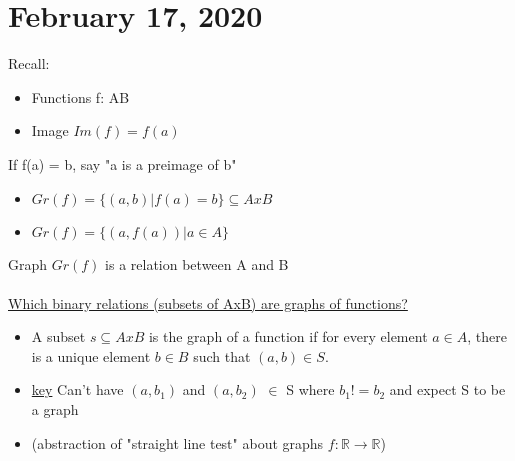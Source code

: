 \documentclass{article}
\begin{document}
\tableofcontents

\section{February 17, 2020}
   
Recall:
\begin{itemize}
  \item Functions f: A\textrightarrow  B
  \item Image $Im(f) = f(a)$
\end{itemize}

\noindent If f(a) = b, say "a is a preimage of b"
\begin{itemize}
  \item $Gr(f) = \{(a,b) | f(a)=b\}\subseteq AxB$
  \item $Gr(f) = \{(a,f(a)) | a \in A\}$
\end{itemize}

\noindent Graph $Gr(f)$ is a relation between A and B\\
\\
\underline{Which binary relations (subsets of AxB) are graphs of functions?}
\begin{itemize}
  \item A subset $s\subseteq AxB$ is the graph of a function if for every element $a \in A$, there is a unique element $b \in B$ such that $(a,b) \in S$.
  \item \underline{key} Can't have $(a, b_1)$ and $(a, b_2)$ $\in$ S where $b_1 != b_2$ and expect S to be a graph
  \item (abstraction of "straight line test" about graphs $f:\mathbb{R}\rightarrow\mathbb{R}$)
\end{itemize}

      






\end{document}
